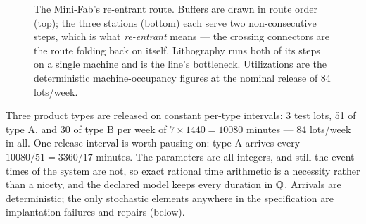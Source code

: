\begin{figure}[t]
\caption{The Mini-Fab's re-entrant route. Buffers are drawn in route
order (top); the three stations (bottom) each serve two
non-consecutive steps, which is what \emph{re-entrant} means --- the
crossing connectors are the route folding back on itself. Lithography
runs both of its steps on a single machine and is the line's
bottleneck. Utilizations are the deterministic machine-occupancy
figures at the nominal release of 84 lots/week.}
\label{fig:minifab-route}
\end{figure}

Three product types are released on constant per-type intervals:
3 test lots, 51 of type A, and 30 of type B per week of $7 \times
1440 = 10080$ minutes --- 84 lots/week in all. One release interval
is worth pausing on: type A arrives every $10080/51 = 3360/17$
minutes. The parameters are all integers, and still the event times
of the system are not, so exact rational time arithmetic is a
necessity rather than a nicety, and the declared model keeps
every duration in $\mathbb{Q}$. Arrivals are deterministic; the only
stochastic elements anywhere in the specification are implantation
failures and repairs (below).

